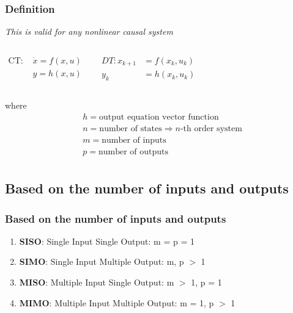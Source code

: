 \begin{frame}
\frametitle{Definition}
    \emph{This is valid for any \color{red}nonlinear} \emph{causal system}

        \begin{columns}
		        \begin{align*}
		       \text{CT: }&\dot{x}=f(x,u) \\
	        	&y=h(x,u)
	        	\end{align*}

		        \begin{align*}
     	        DT: x_{k+1}&=f(x_k,u_k)\\
     	        y_k&=h(x_k,u_k)
		        \end{align*}
		 \end{columns}


\vspace{0.5cm}
where
\vspace{-0.5cm}
\begin{align*}
    &\mathit{h} = \text{output equation vector function}\\
    &\mathit{n} = \text{number of states} \Rightarrow n \text{-th order system}\\
    &\mathit{m} = \text{number of inputs}\\
    &\mathit{p} = \text{number of outputs}\\
\end{align*}
\end{frame}

\subsection{Based on the number of inputs and outputs}
\begin{frame}
	\frametitle{Based on the number of inputs and outputs}
	\vspace{-8ex}
	\begin{enumerate}
		\item \textbf{SISO}: Single Input Single Output:  m = p = 1
		\medskip
		\item \textbf{SIMO}: Single Input Multiple Output: m, p $>$ 1
		\medskip
		\item \textbf{MISO}: Multiple Input Single Output: m $>$ 1, p = 1
		\medskip
		\item \textbf{MIMO}: Multiple Input Multiple Output: m = 1, p $>$ 1
		\medskip

	\end{enumerate}
\end{frame}

